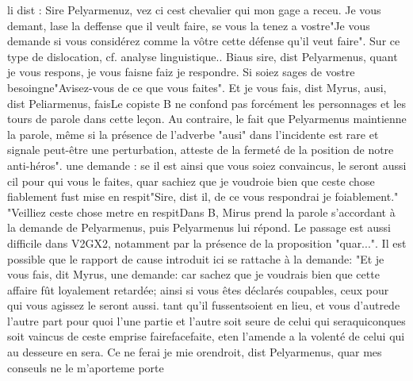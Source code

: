 \documentclass{article}
\begin{document}
\begin{pages}
                  li dist : Sire Pelyarmenuz, vez ci cest
                     chevalier qui mon gage a receu. Je vous demant, 
                     lase la deffense que il veult faire, se vous la tenez a vostre"Je vous demande si vous considérez comme la vôtre cette
                     défense qu'il veut faire". Sur ce type de dislocation, cf. analyse
                     linguistique..
               Biaus sire, dist Pelyarmenus, quant je vous respons, 
                     je vous faisne faiz je respondre. Si soiez sages de vostre besoingne"Avisez-vous de ce que vous faites".
               Et je vous 
                     fais, dist Myrus, ausi, dist Peliarmenus, faisLe copiste B ne confond pas forcément les
                     personnages et les tours de parole dans cette leçon. Au contraire, le fait que
                     Pelyarmenus maintienne la parole, même si la présence de l'adverbe "ausi" dans
                     l'incidente est rare et signale peut-être une perturbation, atteste de la
                     fermeté de la position de notre
                  anti-héros".
                  une demande : 
                     se il est ainsi que vous soiez convaincus, le seront
                        aussi cil pour qui vous le faites, quar sachiez que je voudroie bien que
                        ceste chose fiablement fust mise en respit"Sire, dist il, de ce vous respondrai je foiablement." "Veilliez
                        ceste chose metre en respitDans B, Mirus prend la parole s'accordant à la
                     demande de Pelyarmenus, puis Pelyarmenus lui répond. Le passage est aussi
                     difficile dans V2GX2, notamment par la présence de la proposition "quar...". Il
                     est possible que le rapport de cause introduit ici se rattache à la demande:
                     "Et je vous fais, dit Myrus, une demande: car sachez que je voudrais bien que
                     cette affaire fût loyalement retardée; ainsi si vous êtes déclarés coupables,
                     ceux pour qui vous agissez le seront aussi. tant
                  qu’il 
                     fussentsoient en lieu, et vous 
                     d’autrede l'autre part pour quoi l’une partie et l’autre soit seure 
                     de celui qui seraquiconques soit vaincus de ceste emprise 
                     fairefacefaite, 
                     eten l'amende a la volenté de celui qui au desseure en sera.
               Ce ne ferai je mie orendroit, 
                     dist Pelyarmenus, quar mes conseuls ne le 
                     m’aporteme porte
                  

\end{pages}
\end{document}
